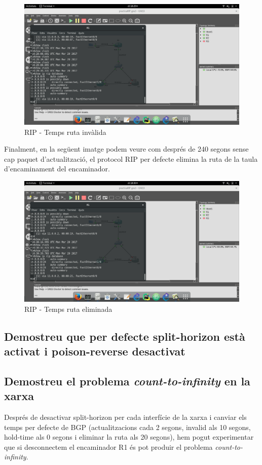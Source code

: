 \documentclass[10pt]{article}
\begin{document}
\begin{figure}[H]
\begin{center}
\includegraphics[scale=0.3]{Images/RIP-invalid2.png}
\caption{RIP - Temps ruta invàlida}
\end{center}
\end{figure}
Finalment, en la següent imatge podem veure com després de 240 segons sense cap paquet d'actualització, el protocol RIP per defecte elimina la ruta de la taula d'encaminament del encaminador.
\begin{figure}[H]
\begin{center}
\includegraphics[scale=0.3]{Images/RIP-flush.png}
\caption{RIP - Temps ruta eliminada}
\end{center}
\end{figure}
\subsection{Demostreu que per defecte split-horizon està activat i poison-reverse desactivat}

\subsection{Demostreu el problema  	\textit{count-to-infinity} en la xarxa}
Després de desactivar split-horizon per cada interfície de la xarxa i canviar els temps per defecte de BGP (actualitzacions cada 2 segons, invalid als 10 segons, hold-time als 0 segons i eliminar la ruta als 20 segons), hem pogut experimentar que si desconnectem el encaminador R1 és pot produir el problema \textit{count-to-infinity}.
\end{document}

